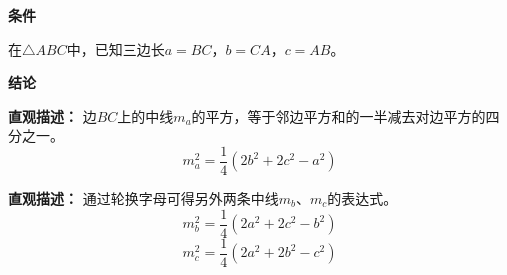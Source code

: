 \begin{statementbox}
	\textbf{\textcolor{CStatement}{条件}}
	\begin{description}[style=nextline, leftmargin=2.8em, labelsep=0.5em, itemsep=0.35em]
		\item[\textbf{\textcolor{CStatement}{条件 1（三边已知）：}}]
			在$\triangle ABC$中，已知三边长$a=BC$，$b=CA$，$c=AB$。
	\end{description}
	\textbf{\textcolor{CStatement}{结论}}
	\begin{description}[style=nextline, leftmargin=2.8em, labelsep=0.5em, itemsep=0.45em]
		\item[\textbf{\textcolor{CStatement}{结论一（中线平方公式）：}}]
			\textbf{\textcolor{CStatement}{直观描述：}}
			边$BC$上的中线$m_a$的平方，等于邻边平方和的一半减去对边平方的四分之一。
			\[
				m_a^2 = \frac{1}{4}(2b^2 + 2c^2 - a^2)
			\]
		\item[\textbf{\textcolor{CStatement}{推广结论（其余中线公式）：}}]
			\textbf{\textcolor{CStatement}{直观描述：}}
			通过轮换字母可得另外两条中线$m_b$、$m_c$的表达式。
			\[
				m_b^2 = \frac{1}{4}(2a^2 + 2c^2 - b^2)
			\]
			\[
				m_c^2 = \frac{1}{4}(2a^2 + 2b^2 - c^2)
			\]
	\end{description}

\end{statementbox}
